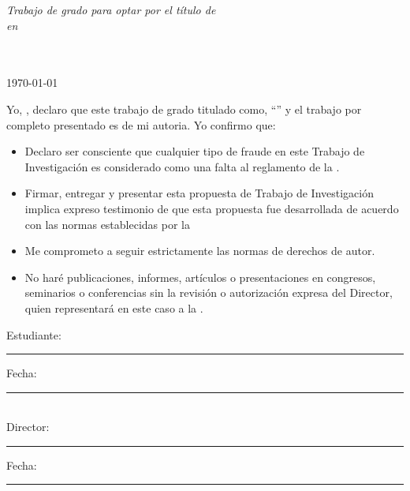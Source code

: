 \documentclass[
11pt, %
spanish, %
singlespacing, %
headsepline, %
]{MastersDoctoralThesis} %
\begin{document}
\begin{titlepage}
\begin{center}
\vfill

\large \textit{Trabajo de grado para optar por el título de \degreename}\\[0.3cm] %
\textit{en}\\[0.4cm]
\groupname\\\deptname\\[2cm] %
 
\vfill

{\large \today}\\[4cm] %
 
\vfill
\end{center}
\end{titlepage}


\begin{declaration}
\addchaptertocentry{\authorshipname} %
\noindent Yo, \authorname, declaro que este trabajo de grado titulado como, \enquote{\ttitle} y el trabajo por completo presentado es de mi autoria. Yo confirmo que:

\begin{itemize} 
\item Declaro ser consciente que cualquier tipo de fraude en este Trabajo de Investigación es considerado como una falta al reglamento de la {\univname}. 

\item Firmar, entregar y presentar esta propuesta de Trabajo de Investigación implica expreso testimonio de que esta propuesta fue desarrollada de acuerdo con las normas establecidas por la {\univname}
\item Me comprometo a seguir estrictamente las normas de derechos de autor. 
\item No haré publicaciones, informes, artículos o presentaciones en congresos, seminarios o conferencias sin la revisión o autorización expresa del Director, quien representará en este caso a la {\univname}.

\end{itemize}
 
\noindent Estudiante:\\
\rule[0.5em]{25em}{0.5pt} %
 
\noindent Fecha:\\
\rule[0.5em]{25em}{0.5pt} %
\\
\noindent Director:\\
\rule[0.5em]{25em}{0.5pt} %
 
\noindent Fecha:\\
\rule[0.5em]{25em}{0.5pt} %


\end{declaration}
\end{document}
